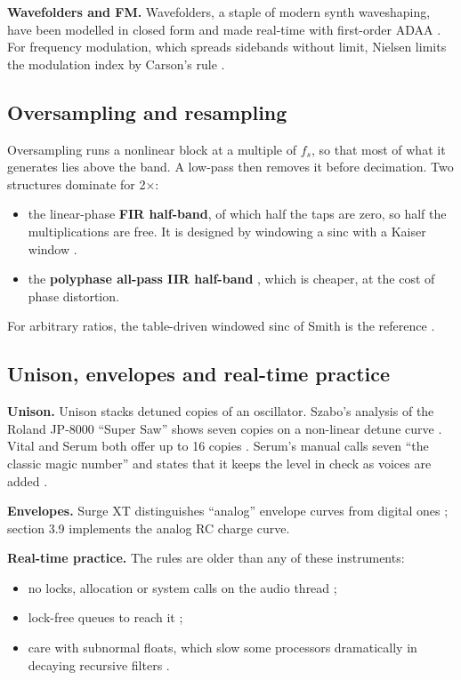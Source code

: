\documentclass[conference]{IEEEtran}
\begin{document}
\textbf{Wavefolders and FM.} Wavefolders, a staple of modern synth waveshaping, have been modelled in closed form and made real-time with first-order ADAA \cite{r10}. For frequency modulation, which spreads sidebands without limit, Nielsen limits the modulation index by Carson's rule \cite{r24}.

\setcounter{subsection}{7}
\subsection{Oversampling and resampling}
Oversampling runs a nonlinear block at a multiple of $f_s$, so that most of what it generates lies above the band. A low-pass then removes it before decimation. Two structures dominate for 2×:

\begin{itemize}
\item the linear-phase \textbf{FIR half-band}, of which half the taps are zero, so half the multiplications are free. It is designed by windowing a sinc with a Kaiser window \cite{r18,r31}.
\item the \textbf{polyphase all-pass IIR half-band} \cite{r35,r26}, which is cheaper, at the cost of phase distortion.
\end{itemize}

For arbitrary ratios, the table-driven windowed sinc of Smith is the reference \cite{r31}.

\setcounter{subsection}{8}
\subsection{Unison, envelopes and real-time practice}
\textbf{Unison.} Unison stacks detuned copies of an oscillator. Szabo's analysis of the Roland JP-8000 ``Super Saw'' shows seven copies on a non-linear detune curve \cite{r34}. Vital and Serum both offer up to 16 copies \cite{S1,S3}. Serum's manual calls seven ``the classic magic number'' and states that it keeps the level in check as voices are added \cite{S3}.

\textbf{Envelopes.} Surge XT distinguishes ``analog'' envelope curves from digital ones \cite{S5}; section 3.9 implements the analog RC charge curve.

\textbf{Real-time practice.} The rules are older than any of these instruments:

\begin{itemize}
\item no locks, allocation or system calls on the audio thread \cite{r2};
\item lock-free queues to reach it \cite{r15};
\item care with subnormal floats, which slow some processors dramatically in decaying recursive filters \cite{r8}.
\end{itemize}
\end{document}

